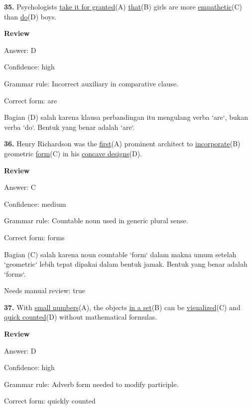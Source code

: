\documentclass[12pt]{article}
\begin{document}
\endgroup
\par
\vspace{\questionblockgap}
\noindent\textbf{35.} Psychologists \uline{take it for granted}(A) \uline{that}(B) girls are more \uline{empathetic}(C) than \uline{do}(D) boys.
\par
\begingroup
\setlength{\parskip}{0pt}
\setlength{\parindent}{0pt}
\textbf{Review}\par
Answer: D\par
Confidence: high\par
Grammar rule: Incorrect auxiliary in comparative clause.\par
Correct form: are\par
Bagian (D) salah karena klausa perbandingan itu mengulang verba `are`, bukan verba `do`. Bentuk yang benar adalah `are`.\par
\endgroup
\par
\vspace{\questionblockgap}
\noindent\textbf{36.} Henry Richardson was the \uline{first}(A) prominent architect to \uline{incorporate}(B) geometric \uline{form}(C) in his \uline{concave designs}(D).
\par
\begingroup
\setlength{\parskip}{0pt}
\setlength{\parindent}{0pt}
\textbf{Review}\par
Answer: C\par
Confidence: medium\par
Grammar rule: Countable noun used in generic plural sense.\par
Correct form: forms\par
Bagian (C) salah karena noun countable `form` dalam makna umum setelah `geometric` lebih tepat dipakai dalam bentuk jamak. Bentuk yang benar adalah `forms`.\par
Needs manual review: true\par
\endgroup
\par
\vspace{\questionblockgap}
\noindent\textbf{37.} With \uline{small numbers}(A), the objects \uline{in a set}(B) can be \uline{visualized}(C) and \uline{quick counted}(D) without mathematical formulas.
\par
\begingroup
\setlength{\parskip}{0pt}
\setlength{\parindent}{0pt}
\textbf{Review}\par
Answer: D\par
Confidence: high\par
Grammar rule: Adverb form needed to modify participle.\par
Correct form: quickly counted\par
\end{document}
